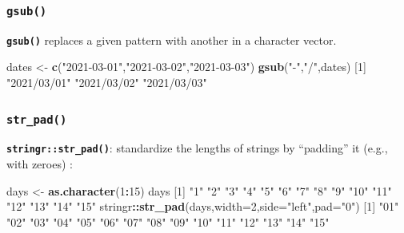 \documentclass[]{book}
\newenvironment{Shaded}{\begin{snugshade}}{\end{snugshade}}
\newcommand{\DataTypeTok}[1]{\textcolor[rgb]{0.13,0.29,0.53}{#1}}
\newcommand{\DecValTok}[1]{\textcolor[rgb]{0.00,0.00,0.81}{#1}}
\newcommand{\KeywordTok}[1]{\textcolor[rgb]{0.13,0.29,0.53}{\textbf{#1}}}
\newcommand{\NormalTok}[1]{#1}
\newcommand{\OperatorTok}[1]{\textcolor[rgb]{0.81,0.36,0.00}{\textbf{#1}}}
\newcommand{\StringTok}[1]{\textcolor[rgb]{0.31,0.60,0.02}{#1}}
\begin{document}
\hypertarget{gsub}{%
\subsubsection*{\texorpdfstring{\texttt{gsub()}}{gsub()}}\label{gsub}}

\textbf{\texttt{gsub()}} replaces a given pattern with another in a character vector.

\begin{Shaded}
\begin{Highlighting}[]
\NormalTok{dates <-}\StringTok{ }\KeywordTok{c}\NormalTok{(}\StringTok{"2021-03-01"}\NormalTok{,}\StringTok{"2021-03-02"}\NormalTok{,}\StringTok{"2021-03-03"}\NormalTok{)}
\KeywordTok{gsub}\NormalTok{(}\StringTok{"-"}\NormalTok{,}\StringTok{"/"}\NormalTok{,dates)}
\NormalTok{[}\DecValTok{1}\NormalTok{] }\StringTok{"2021/03/01"} \StringTok{"2021/03/02"} \StringTok{"2021/03/03"}
\end{Highlighting}
\end{Shaded}

\hypertarget{str_pad}{%
\subsubsection*{\texorpdfstring{\texttt{str\_pad()}}{str\_pad()}}\label{str_pad}}

\textbf{\texttt{stringr::str\_pad()}}: standardize the lengths of strings by ``padding'' it (e.g., with zeroes) :

\begin{Shaded}
\begin{Highlighting}[]
\NormalTok{days <-}\StringTok{ }\KeywordTok{as.character}\NormalTok{(}\DecValTok{1}\OperatorTok{:}\DecValTok{15}\NormalTok{)}
\NormalTok{days}
\NormalTok{ [}\DecValTok{1}\NormalTok{] }\StringTok{"1"}  \StringTok{"2"}  \StringTok{"3"}  \StringTok{"4"}  \StringTok{"5"}  \StringTok{"6"}  \StringTok{"7"}  \StringTok{"8"}  \StringTok{"9"}  \StringTok{"10"} \StringTok{"11"} \StringTok{"12"} \StringTok{"13"} \StringTok{"14"} \StringTok{"15"}
\NormalTok{stringr}\OperatorTok{::}\KeywordTok{str_pad}\NormalTok{(days,}\DataTypeTok{width=}\DecValTok{2}\NormalTok{,}\DataTypeTok{side=}\StringTok{"left"}\NormalTok{,}\DataTypeTok{pad=}\StringTok{"0"}\NormalTok{)}
\NormalTok{ [}\DecValTok{1}\NormalTok{] }\StringTok{"01"} \StringTok{"02"} \StringTok{"03"} \StringTok{"04"} \StringTok{"05"} \StringTok{"06"} \StringTok{"07"} \StringTok{"08"} \StringTok{"09"} \StringTok{"10"} \StringTok{"11"} \StringTok{"12"} \StringTok{"13"} \StringTok{"14"} \StringTok{"15"}
\end{Highlighting}
\end{Shaded}
\end{document}
